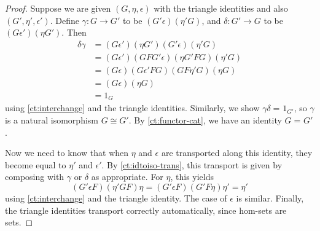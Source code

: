 \documentclass[10pt,a4paper]{article}
\newcommand{\id}[3][]{\ensuremath{#2 =_{#1} #3}\xspace}
\theoremstyle{definition}
\theoremstyle{remark}
\numberwithin{equation}{section}
\begin{document}
\begin{proof}
  Suppose we are given $(G,\eta,\epsilon)$ with the triangle identities and also $(G',\eta',\epsilon')$.
  Define $\gamma:G\to G'$ to be $(G'\epsilon)(\eta' G)$, and $\delta:G'\to G$ to be $(G\epsilon')(\eta G')$.
  Then
  \begin{align*}
    \delta\gamma &=
    (G\epsilon')(\eta G')(G'\epsilon)(\eta'G)\\
    &= (G\epsilon')(G F G'\epsilon)(\eta G' F G)(\eta'G)\\
    &= (G\epsilon)(G\epsilon'FG)(G F \eta' G)(\eta G)\\
    &= (G\epsilon)(\eta G)\\
    &= 1_G
  \end{align*}
  using \cref{ct:interchange} and the triangle identities.
  Similarly, we show $\id{\gamma\delta}{1_{G'}}$, so $\gamma$ is a natural isomorphism $G\cong G'$.
  By \cref{ct:functor-cat}, we have an identity $\id G {G'}$.

  Now we need to know that when $\eta$ and $\epsilon$ are transported along this identity, they become equal to $\eta'$ and $\epsilon'$.
  By \cref{ct:idtoiso-trans}, this transport is given by composing with $\gamma$ or $\delta$ as appropriate.
  For $\eta$, this yields
  \begin{equation*}
    (G'\epsilon F)(\eta'GF)\eta
    = (G'\epsilon F)(G'F\eta)\eta'
    = \eta'
  \end{equation*}
  using \cref{ct:interchange} and the triangle identity.
  The case of $\epsilon$ is similar.
  Finally, the triangle identities transport correctly automatically, since hom-sets are sets.
\end{proof}
\end{document}
